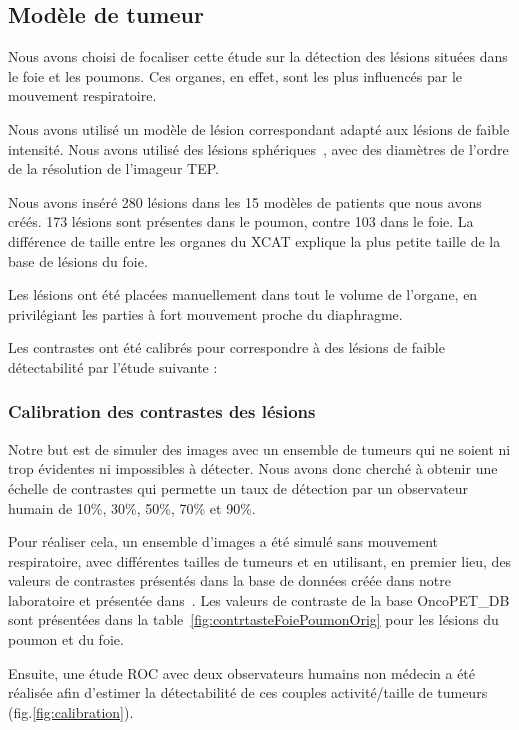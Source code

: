 \subsection{Modèle de tumeur}

Nous avons choisi de focaliser cette étude sur la détection des lésions situées dans le foie et les poumons. Ces organes, en effet, sont les plus influencés par le mouvement respiratoire.

Nous avons utilisé un modèle de lésion correspondant adapté aux lésions de faible intensité. Nous avons utilisé des lésions sphériques~\cite{bai2009regularized}, avec des diamètres de l'ordre de la résolution de l'imageur TEP.

Nous avons inséré 280 lésions dans les 15 modèles de patients que nous avons créés. 173 lésions sont présentes dans le poumon, contre 103 dans le foie. La différence de taille entre les organes du XCAT explique la plus petite taille de la base de lésions du foie. 

Les lésions ont été placées manuellement dans tout le volume de l'organe, en privilégiant les parties à fort mouvement proche du diaphragme. 

Les contrastes ont été calibrés pour correspondre à des lésions de faible détectabilité par l'étude suivante :

\subsubsection{Calibration des contrastes des lésions}
\label{lab:etudeDetect}


Notre but est de simuler des images avec un ensemble de tumeurs qui ne soient ni trop évidentes ni impossibles à détecter. Nous avons donc cherché à obtenir une échelle de contrastes qui permette un taux de détection par un observateur humain de 10\%, 30\%, 50\%, 70\% et 90\%.

Pour réaliser cela, un ensemble d'images a été simulé sans mouvement respiratoire, avec différentes tailles de tumeurs et en utilisant, en premier lieu, des valeurs de contrastes présentés dans la base de données créée dans notre laboratoire et présentée dans~\cite{tomei2010oncopet_db}. Les valeurs de contraste de la base OncoPET\_DB sont présentées dans la table~\ref{fig:contrtasteFoiePoumonOrig} pour les lésions du poumon et du foie.


Ensuite, une étude ROC avec deux observateurs humains non médecin a été réalisée afin d'estimer la détectabilité de ces couples activité/taille de tumeurs (fig.\ref{fig:calibration}). 


